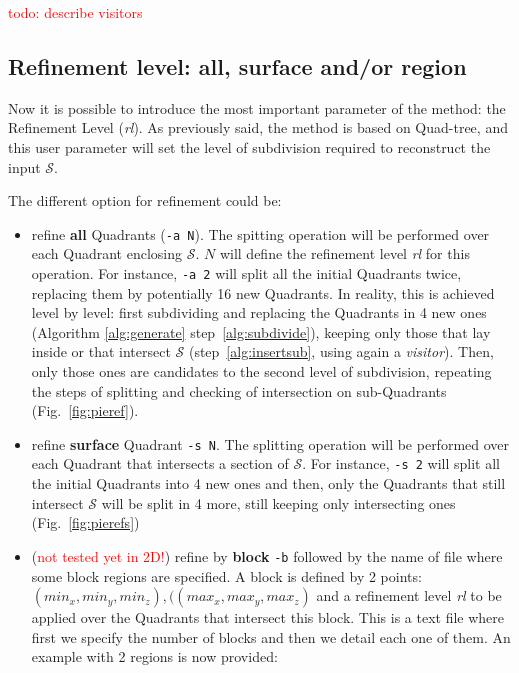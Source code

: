 \documentclass[10pt]{article}
\begin{document}
\textcolor{red}{todo: describe visitors}


\subsection{Refinement level: all, surface and/or region}
\label{s:refinement}
Now it is possible to introduce the most important parameter of the method: the Refinement Level (\textit{rl}).
As previously said, the method is based on Quad-tree, and this user parameter will set the level of subdivision required to reconstruct the input $\mathcal{S}$.

The different option for refinement could be:
\begin{itemize}
\item refine \textbf{all} Quadrants (\texttt{-a N}). The spitting operation will be performed over each Quadrant enclosing $\mathcal{S}$. $N$ will define the refinement level \textit{rl} for this operation. For instance, \texttt{-a 2} will split all the initial Quadrants twice, replacing them by potentially 16 new Quadrants. In reality, this is achieved level by level: first subdividing and replacing the Quadrants in 4 new ones (Algorithm \ref{alg:generate} step~\ref{alg:subdivide}), keeping only those that lay inside or that intersect $\mathcal{S}$ (step~\ref{alg:insertsub}, using again a \textit{visitor}). Then, only those ones are candidates to the second level of subdivision, repeating the steps of splitting and checking of intersection on sub-Quadrants (Fig.~\ref{fig:pieref}). 
\item refine \textbf{surface} Quadrant \texttt{-s N}. The  splitting  operation  will  be  performed  over  each Quadrant  that  intersects  a  section  of $\mathcal{S}$.  For  instance, \texttt{-s  2} will  split  all  the  initial  Quadrants into  4  new  ones  and  then,  only  the  Quadrants  that  still  intersect $\mathcal{S}$ will  be  split  in 4  more, still keeping only intersecting ones (Fig.~\ref{fig:pierefs})
\item (\textcolor{red}{not tested yet in 2D!}) refine by \textbf{block} \texttt{-b} followed by the name of file where some block regions are specified. A block is defined by 2 points: $(min_x, min_y,min_z), ((max_x, max_y,max_z)$ and a refinement level \textit{rl} to be applied over the Quadrants that intersect this block. This is a text file where first we specify the number of blocks and then we detail each one of them. An example with 2 regions is now provided:\\

\end{itemize}
\end{document}
